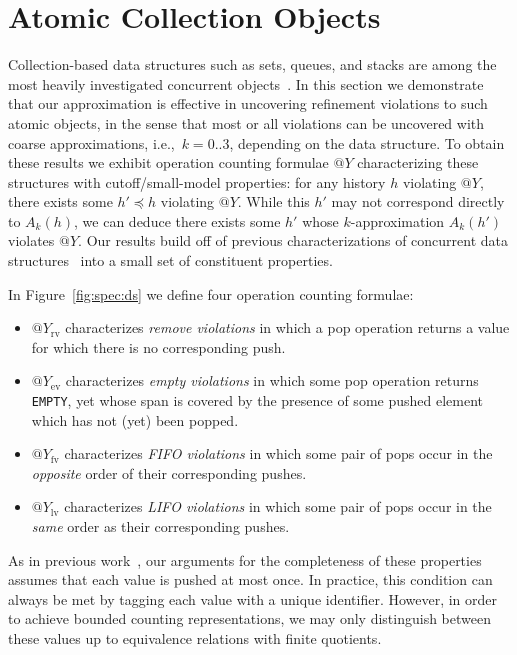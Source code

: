 \section{Atomic Collection Objects}
\label{sec:containers}

Collection-based data structures such as sets, queues, and stacks are among the
most heavily investigated concurrent objects~\cite{chapter/cds/MoirS07}. In
this section we demonstrate that our approximation is effective in uncovering
refinement violations to such atomic objects, in the sense that most or all violations
can be uncovered with coarse approximations, i.e.,~$k=0..3$, depending on the
data structure. To obtain these results we exhibit operation counting formulae
$@Y$ characterizing these structures with cutoff/small-model properties: for
any history $h$ violating $@Y$, there exists some $h' \preceq h$ violating
$@Y$. While this $h'$ may not correspond directly to $A_k(h)$, we can deduce
there exists some $h'$ whose $k$-approximation $A_k(h')$ violates $@Y$. Our
results build off of previous characterizations of concurrent data
structures~\cite{conf/tacas/AbdullaHHJR13, conf/concur/HenzingerSV13} into a
small set of constituent properties.

In Figure~\ref{fig:spec:ds} we define four operation counting formulae:
\begin{itemize}

  \item $@Y_\mathrm{rv}$ characterizes \emph{remove violations} in which a
  {\sf pop} operation returns a value for which there is no corresponding {\sf
  push}.

  \item $@Y_\mathrm{ev}$ characterizes \emph{empty violations} in which some
  {\sf pop} operation returns {\tt EMPTY}, yet whose span is covered by the
  presence of some {\sf push}ed element which has not (yet) been {\sf pop}ped.

  \item $@Y_\mathrm{fv}$ characterizes \emph{FIFO violations} in which some
  pair of {\sf pop}s occur in the \emph{opposite} order of their corresponding
  {\sf push}es.

  \item $@Y_\mathrm{lv}$ characterizes \emph{LIFO violations} in which some
  pair of {\sf pop}s occur in the \emph{same} order as their corresponding {\sf
  push}es.

\end{itemize}
As in previous work~\cite{conf/tacas/AbdullaHHJR13, conf/concur/HenzingerSV13},
our arguments for the completeness of these properties assumes that each value
is {\sf push}ed at most once. In practice, this condition can always be met by
tagging each value with a unique identifier. However, in order to achieve
bounded counting representations, we may only distinguish between these values
up to equivalence relations with finite quotients.

